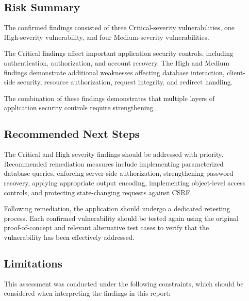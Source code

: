 \subsection*{Risk Summary}

The confirmed findings consisted of three Critical-severity
vulnerabilities, one High-severity vulnerability, and four
Medium-severity vulnerabilities.

The Critical findings affect important application security controls,
including authentication, authorization, and account recovery. The
High and Medium findings demonstrate additional weaknesses affecting
database interaction, client-side security, resource authorization,
request integrity, and redirect handling.

The combination of these findings demonstrates that multiple layers
of application security controls require strengthening.

\subsection*{Recommended Next Steps}

The Critical and High severity findings should be addressed with
priority. Recommended remediation measures include implementing
parameterized database queries, enforcing server-side authorization,
strengthening password recovery, applying appropriate output
encoding, implementing object-level access controls, and protecting
state-changing requests against CSRF.

Following remediation, the application should undergo a dedicated
retesting process. Each confirmed vulnerability should be tested
again using the original proof-of-concept and relevant alternative
test cases to verify that the vulnerability has been effectively
addressed.

\subsection*{Limitations}

This assessment was conducted under the following constraints, which
should be considered when interpreting the findings in this report:

